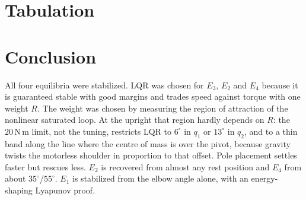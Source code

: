 \documentclass[12pt,a4paper]{article}
\newcommand{\Nm}{\,\mathrm{N\,m}}
\begin{document}
\section{Tabulation}
\begin{table}[H]
\centering
\caption{Summary of the Phase 3 controllers ($|\tau|\le20\Nm$)}
\end{table}

\section{Conclusion}
All four equilibria were stabilized. LQR was chosen for $E_3$, $E_2$ and $E_4$ because it is guaranteed stable with good margins and trades speed against torque with one weight $R$. The weight was chosen by measuring the region of attraction of the nonlinear saturated loop. At the upright that region hardly depends on $R$: the $20\Nm$ limit, not the tuning, restricts LQR to $6^\circ$ in $q_1$ or $13^\circ$ in $q_2$, and to a thin band along the line where the centre of mass is over the pivot, because gravity twists the motorless shoulder in proportion to that offset. Pole placement settles faster but rescues less. $E_2$ is recovered from almost any rest position and $E_4$ from about $35^\circ$/$55^\circ$. $E_1$ is stabilized from the elbow angle alone, with an energy-shaping Lyapunov proof.
\end{document}
